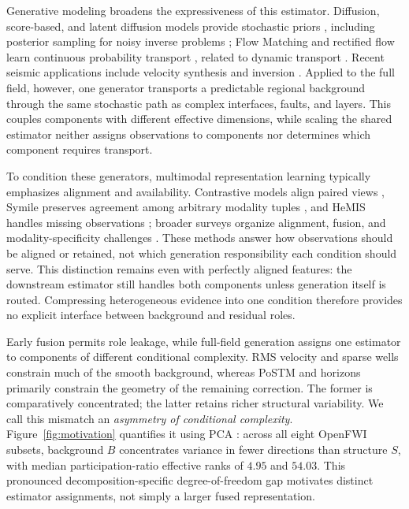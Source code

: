 Generative modeling broadens the expressiveness of this estimator. Diffusion, score-based, and latent diffusion models provide stochastic priors \cite{ho2020ddpm,song2021scorebased,rombach2022ldm}, including posterior sampling for noisy inverse problems \cite{chung2023diffusionposterior}; Flow Matching and rectified flow learn continuous probability transport \cite{lipman2023flowmatching,liu2023rectifiedflow}, related to dynamic transport \cite{benamou2000computational}. Recent seismic applications include velocity synthesis and inversion \cite{wang2024controllable,wang2024wavediffusion}. Applied to the full field, however, one generator transports a predictable regional background through the same stochastic path as complex interfaces, faults, and layers. This couples components with different effective dimensions, while scaling the shared estimator neither assigns observations to components nor determines which component requires transport.

To condition these generators, multimodal representation learning typically emphasizes alignment and availability. Contrastive models align paired views \cite{tian2020cmc,radford2021clip}, Symile preserves agreement among arbitrary modality tuples \cite{saporta2024symile}, and HeMIS handles missing observations \cite{havaei2016hemis}; broader surveys organize alignment, fusion, and modality-specificity challenges \cite{baltrusaitis2019multimodal}. These methods answer how observations should be aligned or retained, not which generation responsibility each condition should serve. This distinction remains even with perfectly aligned features: the downstream estimator still handles both components unless generation itself is routed. Compressing heterogeneous evidence into one condition therefore provides no explicit interface between background and residual roles.

Early fusion permits role leakage, while full-field generation assigns one estimator to components of different conditional complexity. RMS velocity and sparse wells constrain much of the smooth background, whereas PoSTM and horizons primarily constrain the geometry of the remaining correction. The former is comparatively concentrated; the latter retains richer structural variability. We call this mismatch an \emph{asymmetry of conditional complexity}. Figure~\ref{fig:motivation} quantifies it using PCA \cite{jolliffe2002pca}: across all eight OpenFWI subsets, background $B$ concentrates variance in fewer directions than structure $S$, with median participation-ratio effective ranks of $4.95$ and $54.03$. This pronounced decomposition-specific degree-of-freedom gap motivates distinct estimator assignments, not simply a larger fused representation.

